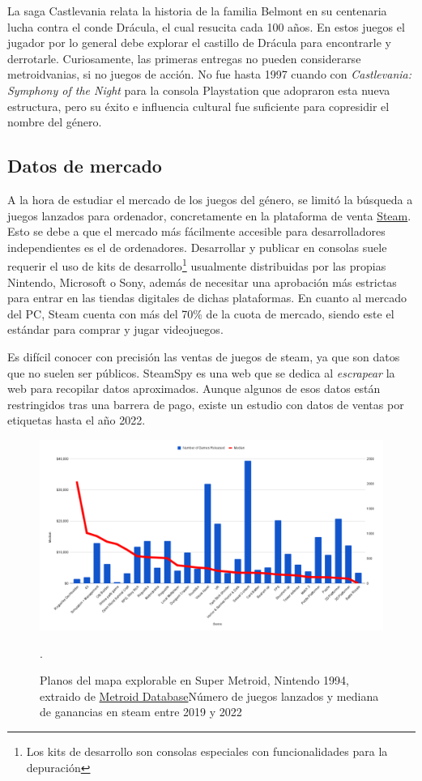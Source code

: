La saga Castlevania relata la historia de la familia Belmont en su centenaria lucha contra el conde Drácula, el cual resucita cada 100 años. En estos juegos el jugador por lo general debe explorar el castillo de Drácula para encontrarle y derrotarle. Curiosamente, las primeras entregas no pueden considerarse metroidvanias, si no juegos de acción. No fue hasta 1997 cuando con \textit{Castlevania: Symphony of the Night} para la consola Playstation que adopraron esta nueva estructura, pero su éxito e influencia cultural fue suficiente para copresidir el nombre del género.

\subsection{Datos de mercado}

A la hora de estudiar el mercado de los juegos del género, se limitó la búsqueda a juegos lanzados para ordenador, concretamente en la plataforma de venta \href{https://store.steampowered.com/?l=spanish}{Steam}. Esto se debe a que el mercado más fácilmente accesible para desarrolladores independientes es el de ordenadores. Desarrollar y publicar en consolas suele requerir el uso de kits de desarrollo\footnote{Los kits de desarrollo son consolas especiales con funcionalidades para la depuración} usualmente distribuidas por las propias Nintendo, Microsoft o Sony, además de necesitar una aprobación más estrictas para entrar en las tiendas digitales de dichas plataformas. En cuanto al mercado del PC, Steam cuenta con más del 70\% de la cuota de mercado\cite{pc-market-share}, siendo este el estándar para comprar y jugar videojuegos.

Es difícil conocer con precisión las ventas de juegos de steam, ya que son datos que no suelen ser públicos. SteamSpy\cite{steamspy} es una web que se dedica al \textit{escrapear} la web para recopilar datos aproximados. Aunque algunos de esos datos están restringidos tras una barrera de pago, existe un estudio\cite{steamgames-genre} con datos de ventas por etiquetas hasta el año 2022.

\begin{figure}[h]
    \centering
    \includegraphics[scale=0.28]{img/genres-chart.png}
    \caption[Datos de venta por género en steam]{Planos del mapa explorable en Super Metroid, Nintendo 1994, extraido de \href{https://metroiddatabase.com/maps/}{Metroid Database}Número de juegos lanzados y mediana de ganancias en steam entre 2019 y 2022}.
    \label{fig:steamgenreschart}
\end{figure}

